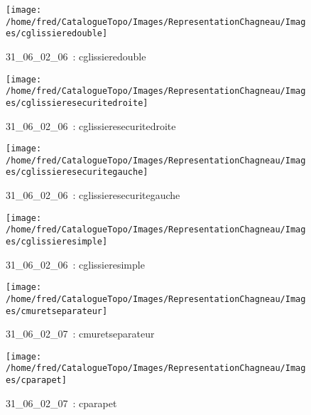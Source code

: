 \documentclass[12pt,titlepage]{book}
\begin{document}
\begin{figure}[h!]
\begin{minipage}[t]{3cm}
    \begin{center}
      \texttt{[image: /home/fred/CatalogueTopo/Images/RepresentationChagneau/Images/cglissieredouble]}
      \caption[~31\_06\_02\_06]{\small{31\_06\_02\_06~:} \tiny{cglissieredouble}}\label{cglissieredouble}
    \end{center}
  \end{minipage}
  \begin{minipage}[t]{3cm}
    \begin{center}
      \texttt{[image: /home/fred/CatalogueTopo/Images/RepresentationChagneau/Images/cglissieresecuritedroite]}
      \caption[~31\_06\_02\_06]{\small{31\_06\_02\_06~:} \tiny{cglissieresecuritedroite}}\label{cglissieresecuritedroite}
    \end{center}
  \end{minipage}
  \begin{minipage}[t]{3cm}
    \begin{center}
      \texttt{[image: /home/fred/CatalogueTopo/Images/RepresentationChagneau/Images/cglissieresecuritegauche]}
      \caption[~31\_06\_02\_06]{\small{31\_06\_02\_06~:} \tiny{cglissieresecuritegauche}}\label{cglissieresecuritegauche}
    \end{center}
  \end{minipage}
  \begin{minipage}[t]{3cm}
    \begin{center}
      \texttt{[image: /home/fred/CatalogueTopo/Images/RepresentationChagneau/Images/cglissieresimple]}
      \caption[~31\_06\_02\_06]{\small{31\_06\_02\_06~:} \tiny{cglissieresimple}}\label{cglissieresimple}
    \end{center}
  \end{minipage}
  \begin{minipage}[t]{3cm}
    \begin{center}
      \texttt{[image: /home/fred/CatalogueTopo/Images/RepresentationChagneau/Images/cmuretseparateur]}
      \caption[~31\_06\_02\_07]{\small{31\_06\_02\_07~:} \tiny{cmuretseparateur}}\label{cmuretseparateur}
    \end{center}
  \end{minipage}
  \begin{minipage}[t]{3cm}
    \begin{center}
      \texttt{[image: /home/fred/CatalogueTopo/Images/RepresentationChagneau/Images/cparapet]}
      \caption[~31\_06\_02\_07]{\small{31\_06\_02\_07~:} \tiny{cparapet}}\label{cparapet}
    \end{center}
  \end{minipage}
\end{figure}
\end{document}
